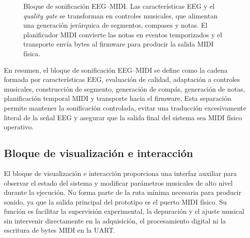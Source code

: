 \documentclass[../main.tex]{subfiles}
\begin{document}
\begin{figure}[H]
    \caption{Bloque de sonificación EEG--MIDI. Las características EEG y el \textit{quality gate} se transforman en controles musicales, que alimentan una generación jerárquica de segmentos, compases y notas. El planificador MIDI convierte las notas en eventos temporizados y el transporte envía bytes al firmware para producir la salida MIDI física.}
    \label{fig:bloque_sonificacion_midi}
\end{figure}

En resumen, el bloque de sonificación EEG--MIDI se define como la cadena formada por características EEG, evaluación de calidad, adaptación a controles musicales, construcción de segmento, generación de compás, generación de notas, planificación temporal MIDI y transporte hacia el firmware. Esta separación permite mantener la sonificación controlada, evitar una traducción excesivamente literal de la señal EEG y asegurar que la salida final del sistema sea MIDI físico operativo.

\subsection{Bloque de visualización e interacción}

El bloque de visualización e interacción proporciona una interfaz auxiliar para observar el estado del sistema y modificar parámetros musicales de alto nivel durante la ejecución. No forma parte de la ruta mínima necesaria para producir sonido, ya que la salida principal del prototipo es el puerto MIDI físico. Su función es facilitar la supervisión experimental, la depuración y el ajuste musical sin intervenir directamente en la adquisición, el procesamiento digital ni la escritura de bytes MIDI en la UART.
\end{document}
